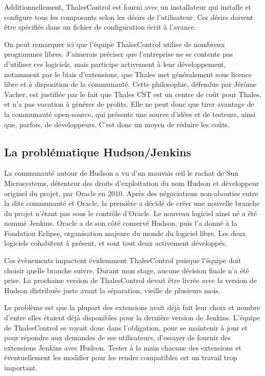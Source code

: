 Additionnellement, ThalesControl est fourni avec un installateur qui installe et
configure tous les composants selon les désirs de l'utilisateur. Ces désirs 
doivent être spécifiés dans un fichier de configuration écrit à l'avance.

On peut remarquer ici que l'équipe ThalesControl utilise de nombreux programmes libres. 
J'aimerais préciser que l'entreprise ne se contente pas d'utiliser ces 
logiciels, mais participe activement à leur développement, notamment par le 
biais d'extensions, que Thales met généralement sous licence libre 
et à disposition de la communauté. Cette philosophie, défendue par Jérôme Vacher,
est justifiée par le fait que Thales CST est un centre de coût pour Thales, et
n'a pas vocation à générer de profits.  Elle ne peut donc que tirer avantage 
de la communauté open-source, qui présente une source d'idées et de testeurs, 
ainsi que, parfois, de développeurs. C'est donc un moyen de réduire les coûts.

\subsection{La problématique Hudson/Jenkins}
\label{Hudson_Jenkins}

La communauté autour de Hudson a vu d'un mauvais {\oe}il le rachat de Sun 
Microsystems, détenteur des droits d'exploitation du nom Hudson et développeur 
originel du projet, par Oracle en 2010. Après des négociations non-abouties 
entre la dite communauté et Oracle, la première a décidé de créer une nouvelle 
branche du projet n'étant pas sous le contrôle d'Oracle. Le nouveau logiciel 
ainsi né a été nommé Jenkins. Oracle a de son côté conservé Hudson, puis l'a 
donné à la Fondation Eclipse, organisation majeure du monde du logiciel libre. 
Les deux logiciels cohabitent à présent, et sont tout deux activement développés.

Ces évènements impactent évidemment ThalesControl puisque l'équipe doit choisir 
quelle branche suivre. Durant mon stage, aucune décision finale n'a été prise.
La prochaine version de ThalesControl devait être livrée avec la version de 
Hudson distribuée juste avant la séparation, vieille de plusieurs mois.

Le problème est que la plupart des extensions avait déjà fait leur choix et 
nombre d'entre elles étaient déjà disponibles pour la dernière version de 
Jenkins. L'équipe de ThalesControl se voyait donc dans l'obligation, pour se 
maintenir à jour et pour répondre aux demandes de ses utilisateurs, d'essayer 
de fournir des extensions Jenkins avec Hudson. Tester à la main chacune des 
extensions et éventuellement les modifier pour les rendre compatibles est un 
travail trop important.

